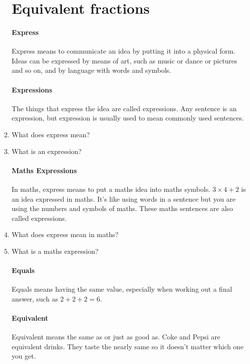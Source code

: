 \documentclass[14pt]{article}
\begin{document}
\begin{enumerate}
\newpage

\section{Equivalent fractions}

\paragraph{Express}
Express means to communicate an idea by putting it into a physical form. Ideas can be expressed by means of art, such as music or dance or pictures and so on, and by language with words and symbols.

\paragraph{Expressions}
The things that express the idea are called expressions. Any sentence is an expression, but expression is usually used to mean commonly used sentences.

\item What does express mean?
\item What is an expression?

\paragraph{Maths Expressions}
In maths, express means to put a maths idea into maths symbols. $3 \times 4 + 2$ is an idea expressed in maths. It's like using words in a sentence but you are using the numbers and symbols of maths. These maths sentences are also called expressions.

\item What does express mean in maths?
\item What is a maths expression?\\

\newpage

\paragraph{Equals}
Equals means having the same value, especially when working out a final answer, such as  $2+2+2=6.$

 \paragraph{Equivalent}
Equivalent means the same as or just as good as. Coke and Pepsi are equivalent drinks. They taste the nearly same so it doesn’t matter which one you get.


\end{enumerate}
\end{document}
